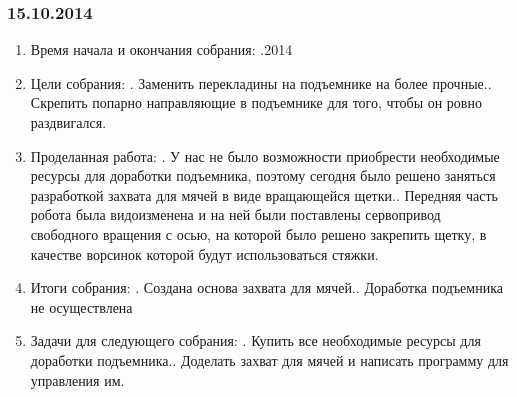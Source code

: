 \documentclass[12pt]{article}
\begin{document}
	      \subsubsection{15.10.2014}
	      \begin{enumerate}
	      	\item Время начала и окончания собрания:
	      	.2014
	      	\item Цели собрания:
	      	.	Заменить перекладины на подъемнике на более прочные..	Скрепить попарно направляющие в подъемнике для того, чтобы он ровно раздвигался.
	      	
	      	\item Проделанная работа:
	      	.	У нас не было возможности приобрести необходимые ресурсы для доработки подъемника, поэтому сегодня было решено заняться разработкой захвата для мячей в виде вращающейся щетки..	Передняя часть робота была видоизменена и на ней были поставлены сервопривод свободного вращения с осью, на которой было решено закрепить щетку, в качестве ворсинок которой будут использоваться стяжки.
	      	
	      	\item Итоги собрания:
	      	.	Создана основа захвата для мячей..	Доработка подъемника не осуществлена
	      	
	      	\item Задачи для следующего собрания:
	      	.	Купить все необходимые ресурсы для доработки подъемника..	Доделать захват для мячей и написать программу для управления им.
	      	
	      \end{enumerate}
	      \newpage
\end{document}
